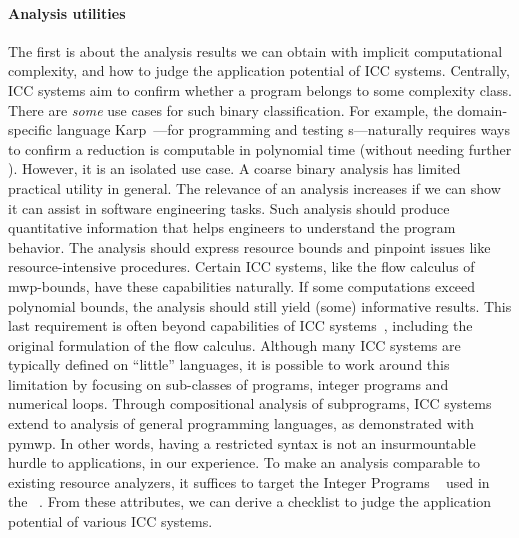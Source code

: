 \paragraph*{Analysis utilities}
The first is about the analysis results we can obtain with implicit computational complexity, and how to judge the application potential of ICC systems.
Centrally, ICC systems aim to confirm whether a program belongs to some complexity class.
There are \emph{some} use cases for such binary classification.
For example, the domain-specific language Karp~\cite{zhang2022}---for programming and testing s---naturally requires ways to confirm a reduction is computable in polynomial time (without needing further ).
However, it is an isolated use case.
A coarse binary analysis has limited practical utility in general.
The relevance of an analysis increases if we can show it can assist in software engineering tasks.
Such analysis should produce quantitative information that helps engineers to understand the program behavior.
The analysis should express resource bounds and pinpoint issues like resource-intensive procedures.
Certain ICC systems, like the flow calculus of mwp-bounds, have these capabilities naturally.
If some computations exceed polynomial bounds, the analysis should still yield (some) informative results.
This last requirement is often beyond capabilities of ICC systems~\cite{baillot2012}, including the original formulation of the flow calculus.
Although many ICC systems are typically defined on \enquote{little} languages, it is possible to work around this limitation by focusing on sub-classes of programs, \eg integer programs and numerical loops.
Through compositional analysis of subprograms, ICC systems extend to analysis of general programming languages, as demonstrated with pymwp.
In other words, having a restricted syntax is not an insurmountable hurdle to applications, in our experience.
To make an analysis comparable to existing resource analyzers, it suffices to target the  Integer Programs ~\cite{cinteger} used in the ~\cite{giesl2019}.
From these attributes, we can derive a checklist to judge the application potential of various ICC systems.

